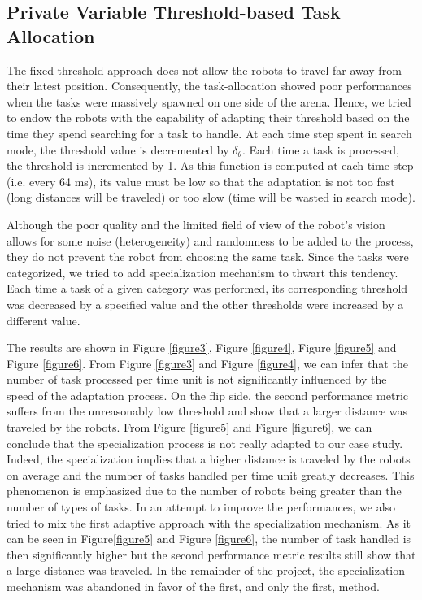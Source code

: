 \subsection{Private Variable Threshold-based Task Allocation}
The fixed-threshold approach does not allow the robots to travel far away from their latest position. Consequently, the task-allocation showed poor performances when the tasks were massively spawned on one side of the arena. Hence, we tried to endow the robots with the capability of adapting their threshold based on the time they spend searching for a task to handle. At each time step spent in search mode, the threshold value is decremented by $\delta_{\theta}$. Each time a task is processed, the threshold is incremented by 1. As this function is computed at each time step (i.e. every 64 ms), its value must be low so that the adaptation is not too fast (long distances will be traveled) or too slow (time will be wasted in search mode).

Although the poor quality and the limited field of view of the robot's vision allows for some noise (heterogeneity) and randomness to be added to the process, they do not prevent the robot from choosing the same task. Since the tasks were categorized, we tried to add specialization mechanism to thwart this tendency. Each time a task of a given category was performed, its corresponding threshold was decreased by a specified value and the other thresholds were increased by a different value.

The results are shown in Figure \ref{figure3}, Figure \ref{figure4}, Figure \ref{figure5} and Figure \ref{figure6}. From Figure \ref{figure3} and Figure \ref{figure4}, we can infer that the number of task processed per time unit is not significantly influenced by the speed of the adaptation process. On the flip side, the second performance metric suffers from the unreasonably low threshold and show that a larger distance was traveled by the robots. From Figure \ref{figure5} and Figure \ref{figure6}, we can conclude that the specialization process is not really adapted to our case study. Indeed, the specialization implies that a higher distance is traveled by the robots on average and the number of tasks handled per time unit greatly decreases. This phenomenon is emphasized due to the number of robots being greater than the number of types of tasks. In an attempt to improve the performances, we also tried to mix the first adaptive approach with the specialization mechanism. As it can be seen in Figure\ref{figure5} and Figure \ref{figure6}, the number of task handled is then significantly higher but the second performance metric results still show that a large distance was traveled. In the remainder of the project, the specialization mechanism was abandoned in favor of the first, and only the first, method.


